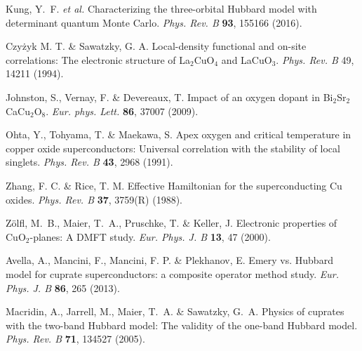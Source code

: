 \documentclass[11pt,superscriptaddress,floatfix,notitlepage]{revtex4-1}
\begin{document}
\begin{thebibliography}{99}

 Kung, Y.~F. \textit{et al.} Characterizing the three-orbital Hubbard model with determinant quantum Monte Carlo. \textit{Phys. Rev. B} {\bf 93}, 155166 (2016).

 Czy\.{z}yk M. T. \&  Sawatzky, G. A. Local-density functional and on-site correlations: The electronic structure of La$_2$CuO$_4$ and LaCuO$_3$. \textit{Phys. Rev. B} 49, 14211 (1994).

 Johnston, S.,  Vernay, F. \&  Devereaux, T. Impact of an oxygen dopant in Bi$_2$Sr$_2$CaCu$_2$O$_8$. \textit{Eur. phys. Lett.} {\bf 86}, 37007 (2009).

 Ohta, Y., Tohyama, T. \& Maekawa, S. Apex oxygen and critical temperature in copper oxide superconductors: Universal correlation with the stability of local singlets. \textit{ Phys. Rev. B} {\bf 43}, 2968 (1991).

Zhang, F. C. \& Rice, T. M. Effective Hamiltonian for the superconducting Cu oxides. \textit{Phys. Rev. B}  {\bf 37}, 3759(R) (1988).

 Z{\"o}lfl, M.~B., Maier, T.~A., Pruschke, T. \&  Keller, J. Electronic properties of CuO$_2$-planes: A DMFT study.
 \textit{Eur. Phys. J. B} {\bf 13}, 47 (2000). 

 Avella, A., Mancini, F., Mancini, F. P. \& Plekhanov, E. Emery vs. Hubbard model for cuprate superconductors: a composite operator method study. \textit{Eur. Phys. J. B} {\bf 86}, 265 (2013). 

 Macridin, A., Jarrell, M., Maier, T.~A. \& Sawatzky, G.~A. Physics of cuprates with the two-band Hubbard model: The validity of the one-band Hubbard model. \textit{Phys. Rev. B} {\bf 71}, 134527 (2005).

\end{thebibliography}
\end{document}
